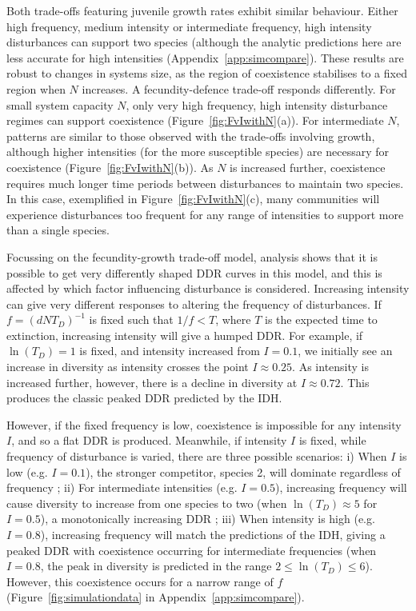 \documentclass[a4paper]{article}
\begin{document}
Both trade-offs featuring juvenile growth rates exhibit similar behaviour. Either high frequency, medium intensity or intermediate frequency, high intensity disturbances can support two species (although the analytic predictions here are less accurate for high intensities (Appendix~\ref{app:simcompare}). These results are robust to changes in systems size, as the region of coexistence stabilises to a fixed region when $N$ increases. A fecundity-defence trade-off responds differently. For small system capacity $N$, only very high frequency, high intensity disturbance regimes can support coexistence (Figure~\ref{fig:FvIwithN}(a)). For intermediate $N$, patterns are similar to those observed with the trade-offs involving growth, although higher intensities (for the more susceptible species) are necessary for coexistence (Figure~\ref{fig:FvIwithN}(b)). As $N$ is increased further, coexistence requires much longer time periods between disturbances to maintain two species. In this case, exemplified in Figure~\ref{fig:FvIwithN}(c), many communities will experience disturbances too frequent for any range of intensities to support more than a single species.

Focussing on the fecundity-growth trade-off model, analysis shows that it is possible to get very differently shaped DDR curves in this model, and this is affected by which factor influencing disturbance is considered. Increasing intensity can give very different responses to altering the frequency of disturbances. If $f=(dNT_D)^{-1}$ is fixed such that $1/f<T$, where $T$ is the expected time to extinction, increasing intensity will give a humped DDR. For example, if $\ln(T_D)=1$ is fixed, and intensity increased from $I=0.1$, we initially see an increase in diversity as intensity crosses the point $I\approx0.25$. As intensity is increased further, however, there is a decline in diversity at $I\approx0.72$. This produces the classic peaked DDR predicted by the IDH.

However, if the fixed frequency is low, coexistence is impossible for any intensity $I$, and so a flat DDR is produced. Meanwhile, if intensity $I$ is fixed, while frequency of disturbance is varied, there are three possible scenarios: i) When $I$ is low (e.g. $I=0.1$), the stronger competitor, species 2, will dominate regardless of frequency ; ii) For intermediate intensities (e.g. $I=0.5$), increasing frequency will cause diversity to increase from one species to two (when $\ln(T_D)\approx 5$ for $I=0.5$), a monotonically increasing DDR ; iii) When intensity is high (e.g. $I=0.8$), increasing frequency will match the predictions of the IDH, giving a peaked DDR with coexistence occurring for intermediate frequencies (when $I=0.8$, the peak in diversity is predicted in the range $2\leq \ln(T_D) \leq 6$). However, this coexistence occurs for a narrow range of $f$ (Figure~\ref{fig:simulationdata} in Appendix~\ref{app:simcompare}).
\end{document}
